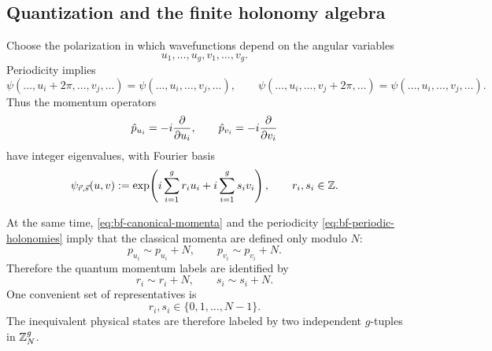 \subsection{Quantization and the finite holonomy algebra}

Choose the polarization in which wavefunctions depend on the angular variables
\begin{equation*}
u_1,\dots,u_g,v_1,\dots,v_g.
\end{equation*}
Periodicity implies
\begin{equation*}
\psi(\dots,u_i+2\pi,\dots,v_j,\dots)=\psi(\dots,u_i,\dots,v_j,\dots),
\qquad
\psi(\dots,u_i,\dots,v_j+2\pi,\dots)=\psi(\dots,u_i,\dots,v_j,\dots).
\end{equation*}
Thus the momentum operators
\begin{equation*}
\hat p_{u_i}=-i\frac{\partial}{\partial u_i},
\qquad
\hat p_{v_i}=-i\frac{\partial}{\partial v_i}
\end{equation*}
have integer eigenvalues, with Fourier basis
\begin{equation}\label{eq:bf-fourier-basis}
\psi_{\vec r,\vec s}(u,v)
:=
\exp\!\left(i\sum_{i=1}^g r_i u_i + i\sum_{i=1}^g s_i v_i\right),
\qquad
r_i,s_i\in \mathbb{Z}.
\end{equation}

\medskip

\noindent At the same time, \eqref{eq:bf-canonical-momenta} and the periodicity \eqref{eq:bf-periodic-holonomies} imply that the classical momenta are defined only modulo $N$:
\begin{equation}\label{eq:bf-momentum-mod-N}
p_{u_i}\sim p_{u_i}+N,
\qquad
p_{v_i}\sim p_{v_i}+N.
\end{equation}
Therefore the quantum momentum labels are identified by
\begin{equation}\label{eq:bf-label-identification}
r_i\sim r_i+N,
\qquad
s_i\sim s_i+N.
\end{equation}
One convenient set of representatives is
\begin{equation}\label{eq:bf-basis-states}
r_i,s_i\in\{0,1,\dots,N-1\}.
\end{equation}
The inequivalent physical states are therefore labeled by two independent $g$-tuples in $\mathbb{Z}_N^g$.

\medskip


